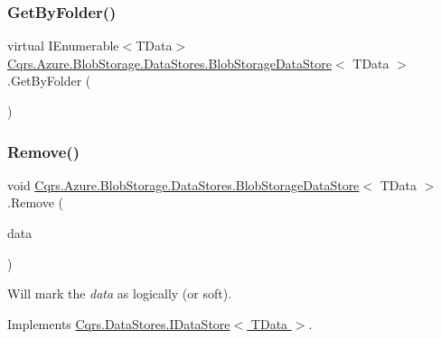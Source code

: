 \subsubsection{\texorpdfstring{Get\+By\+Folder()}{GetByFolder()}}
{\footnotesize\ttfamily virtual I\+Enumerable$<$T\+Data$>$ \hyperlink{classCqrs_1_1Azure_1_1BlobStorage_1_1DataStores_1_1BlobStorageDataStore}{Cqrs.\+Azure.\+Blob\+Storage.\+Data\+Stores.\+Blob\+Storage\+Data\+Store}$<$ T\+Data $>$.Get\+By\+Folder (\begin{DoxyParamCaption}{ }\end{DoxyParamCaption})\hspace{0.3cm}{\ttfamily [virtual]}}

\mbox{\label{classCqrs_1_1Azure_1_1BlobStorage_1_1DataStores_1_1BlobStorageDataStore_af054d4134671d66981c4d91df5c1d481}} 
\subsubsection{\texorpdfstring{Remove()}{Remove()}}
{\footnotesize\ttfamily void \hyperlink{classCqrs_1_1Azure_1_1BlobStorage_1_1DataStores_1_1BlobStorageDataStore}{Cqrs.\+Azure.\+Blob\+Storage.\+Data\+Stores.\+Blob\+Storage\+Data\+Store}$<$ T\+Data $>$.Remove (\begin{DoxyParamCaption}\item[{T\+Data}]{data }\end{DoxyParamCaption})}



Will mark the {\itshape data}  as logically (or soft). 



Implements \hyperlink{interfaceCqrs_1_1DataStores_1_1IDataStore_a7ef540796bbe4257296841590bc23478}{Cqrs.\+Data\+Stores.\+I\+Data\+Store$<$ T\+Data $>$}.


